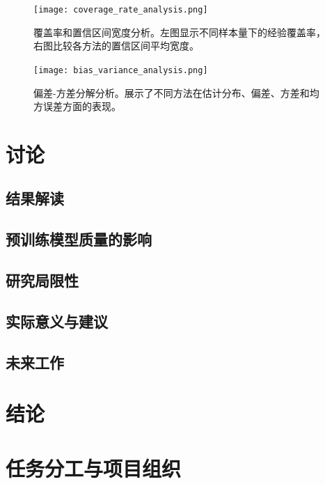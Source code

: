 \documentclass[12pt,a4paper]{article}
\begin{document}
\begin{table}[H]
\begin{figure}[H]
    \centering
    \texttt{[image: coverage\_rate\_analysis.png]}
    \caption{覆盖率和置信区间宽度分析。左图显示不同样本量下的经验覆盖率，右图比较各方法的置信区间平均宽度。}
    \label{fig:coverage_rate_analysis}
\end{figure}

\begin{figure}[H]
    \centering
    \texttt{[image: bias\_variance\_analysis.png]}
    \caption{偏差-方差分解分析。展示了不同方法在估计分布、偏差、方差和均方误差方面的表现。}
    \label{fig:bias_variance_analysis}
\end{figure}


\section{讨论}

\subsection{结果解读}

\subsection{预训练模型质量的影响}

\subsection{研究局限性}

\subsection{实际意义与建议}


\subsection{未来工作}

\section{结论}

\clearpage
{}
{}
\renewcommand{\bibname}{参考文献}
\nocite{*}


\clearpage
{}
{}
\appendix
\section{任务分工与项目组织}

\end{table}
\end{document}
